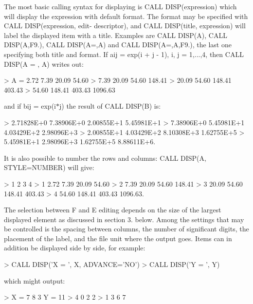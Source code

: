 The most basic calling syntax for displaying is C\+A\+LL D\+I\+S\+P(expression) which will display the expression with default format. The format may be specified with C\+A\+LL D\+I\+SP(expression, edit-\/ descriptor), and C\+A\+LL D\+I\+S\+P(title, expression) will label the displayed item with a title. Examples are C\+A\+LL D\+I\+S\+P(\+A), C\+A\+LL D\+I\+SP(A,\textquotesingle{}F9.\textquotesingle{}), C\+A\+LL D\+I\+SP(\textquotesingle{}A=\textquotesingle{},A) and C\+A\+LL D\+I\+SP(\textquotesingle{}A=\textquotesingle{},A,\textquotesingle{}F9.\textquotesingle{}), the last one specifying both title and format. If aij = exp(i + j -\/ 1), i, j = 1,...,4, then C\+A\+LL D\+I\+SP(\textquotesingle{}A = \textquotesingle{}, A) writes out\+: \begin{DoxyVerb} > A =  2.72    7.39   20.09    54.60
 >      7.39   20.09   54.60   148.41
 >     20.09   54.60  148.41   403.43
 >     54.60  148.41  403.43  1096.63
\end{DoxyVerb}


and if bij = exp(i$\ast$j) the result of C\+A\+LL D\+I\+S\+P(\+B) is\+: \begin{DoxyVerb} > 2.71828E+0  7.38906E+0  2.00855E+1  5.45981E+1
 > 7.38906E+0  5.45981E+1  4.03429E+2  2.98096E+3
 > 2.00855E+1  4.03429E+2  8.10308E+3  1.62755E+5
 > 5.45981E+1  2.98096E+3  1.62755E+5  8.88611E+6.
\end{DoxyVerb}


It is also possible to number the rows and columns\+: C\+A\+LL D\+I\+SP(A, S\+T\+Y\+LE=\textquotesingle{}N\+U\+M\+B\+ER\textquotesingle{}) will give\+: \begin{DoxyVerb} >      1       2       3        4
 > 1   2.72    7.39   20.09    54.60
 > 2   7.39   20.09   54.60   148.41
 > 3  20.09   54.60  148.41   403.43
 > 4  54.60  148.41  403.43  1096.63.
\end{DoxyVerb}


The selection between F and E editing depends on the size of the largest displayed element as discussed in section 3. below. Among the settings that may be controlled is the spacing between columns, the number of significant digits, the placement of the label, and the file unit where the output goes. Items can in addition be displayed side by side, for example\+: \begin{DoxyVerb} > CALL DISP('X = ', X, ADVANCE='NO')
 > CALL DISP('Y = ', Y)
\end{DoxyVerb}


which might output\+: \begin{DoxyVerb} > X = 7  8  3   Y = 11
 >     4  0  2        2
 >     1  3  6        7
\end{DoxyVerb}


